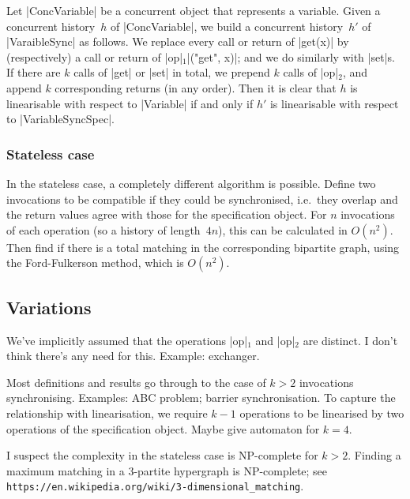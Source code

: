\documentclass[12pt,a4paper]{article}
\def\s#1{$_{#1}$}
\begin{document}
Let |ConcVariable| be a concurrent object that represents a variable.  Given a
concurrent history~$h$ of |ConcVariable|, we build a concurrent history~$h'$
of |VaraibleSync| as follows.  We replace every call or return of |get(x)| by
(respectively) a call or return of |op|\s1|("get", x)|; and we do similarly
with |set|s.  If there are $k$ calls of |get| or |set| in total, we prepend
$k$ calls of |op|\s2, and append $k$ corresponding returns (in any order).
Then it is clear that $h$ is linearisable with respect to |Variable| if and
only if $h'$ is linearisable with respect to |VariableSyncSpec|.


\subsubsection*{Stateless case}

In the stateless case, a completely different algorithm is possible.  Define
two invocations to be compatible if they could be synchronised, i.e.~they
overlap and the return values agree with those for the specification object.
For $n$ invocations of each operation (so a history of length~$4n$), this can
be calculated in $O(n^2)$.  Then find if there is a total matching in the
corresponding bipartite graph, using the Ford-Fulkerson method, which is
$O(n^2)$.


\subsection*{Variations}

We've implicitly assumed that the operations |op|\s1 and |op|\s2 are
distinct.  I don't think there's any need for this.  Example: exchanger.  

Most definitions and results go through to the case of $k > 2$ invocations
synchronising.  Examples: ABC problem; barrier synchronisation.  To capture
the relationship with linearisation, we require $k-1$ operations to be
linearised by two operations of the specification object.  Maybe give
automaton for $k = 4$.  

I suspect the complexity in the stateless case is NP-complete for $k > 2$.
Finding a maximum matching in a 3-partite hypergraph is NP-complete; see
\verb|https://en.wikipedia.org/wiki/3-dimensional_matching|.

\end{document}
